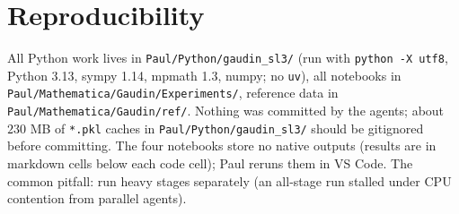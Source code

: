 \documentclass[11pt]{article}
\begin{document}
\section{Reproducibility}\label{app:repro}

All Python work lives in \texttt{Paul/\allowbreak{}Python/\allowbreak{}gaudin\_\allowbreak{}sl3/\allowbreak{}} (run with \texttt{python -\allowbreak{}X utf8}, Python 3.13, sympy 1.14, mpmath 1.3, numpy; no \texttt{uv}), all notebooks in \texttt{Paul/\allowbreak{}Mathematica/\allowbreak{}Gaudin/\allowbreak{}Experiments/\allowbreak{}}, reference data in \texttt{Paul/\allowbreak{}Mathematica/\allowbreak{}Gaudin/\allowbreak{}ref/\allowbreak{}}. Nothing was committed by the agents; about $230$ MB of \texttt{*.\allowbreak{}pkl} caches in \texttt{Paul/\allowbreak{}Python/\allowbreak{}gaudin\_\allowbreak{}sl3/\allowbreak{}} should be gitignored before committing.
The four notebooks store no native outputs (results are in markdown cells below each code cell); Paul reruns them in VS Code.
The common pitfall: run heavy stages separately (an all-stage run stalled under CPU contention from parallel agents).
\end{document}
